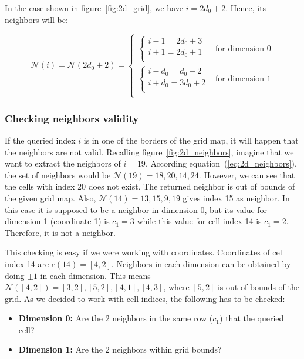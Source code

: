 \documentclass[12pt]{article}
\begin{document}
In the case shown in figure~\ref{fig:2d_grid}, we have $ i = 2d_0+2$. Hence, its neighbors will be:

\begin{equation}
  \mathcal{N}(i) = \mathcal{N}(2d_0+2) =
  \begin{cases}
      \begin{cases}
      i-1 = 2d_0+3\\
      i+1 = 2d_0+1\\
    \end{cases} & \text{for dimension 0}\\
     \begin{cases}
      i-d_0 = d_0+2\\
      i+d_0 = 3d_0+2\\
    \end{cases} & \text{for dimension 1}\\
  \end{cases}
\end{equation}

\subsubsection{Checking neighbors validity}
If the queried index $i$ is in one of the borders of the grid map, it will happen that the neighbors are not valid. Recalling 
figure~\ref{fig:2d_neighbors}, imagine that we want to extract the neighbors of $i=19$. According equation~(\ref{eq:2d_neighbors}),
the set of neighbors would be $\mathcal{N}(19)={18,20,14,24}$. However, we can see that the cells with index 20 does not exist. The returned neighbor is out of bounds of the given grid map. Also, $\mathcal{N}(14)={13,15,9,19}$ gives index 15 as neighbor. In this case it is supposed to be a neighbor in dimension 0, but its value for dimension 1 (coordinate 1) is $c_1=3$ while this value for cell index 14 is $c_1=2$. Therefore, it is not a neighbor.

This checking is easy if we were working with coordinates. Coordinates of cell index 14 are $c(14)=[4,2]$. Neighbors in each dimension can be obtained by doing $\pm1$ in each dimension. This means $\mathcal{N}([4,2])={[3,2],[5,2],[4,1],[4,3]}$, where $[5,2]$ is out of bounds of the grid. As we decided to work with cell indices, the following has to be checked:

\begin{itemize}
 \item \textbf{Dimension 0:} Are the 2 neighbors in the same row ($c_1$) that the queried cell?
 \item \textbf{Dimension 1:} Are the 2 neighbors within grid bounds?
\end{itemize}
\end{document}
